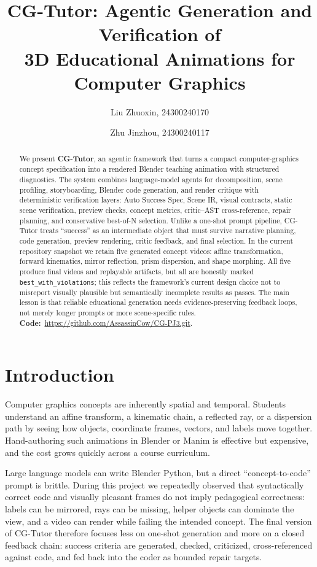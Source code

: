 \documentclass[10pt,letterpaper]{article}
\title{\bfseries CG-Tutor: Agentic Generation and Verification of\\
3D Educational Animations for Computer Graphics}
\author[1]{Liu Zhuoxin, 24300240170}
\author[1]{Zhu Jinzhou, 24300240117}
\affil[1]{Fudan University, Computer Graphics 2026 Spring Project 3}
\date{}
\newcommand{\github}{\url{https://github.com/AssassinCow/CG-PJ3.git}}
\begin{document}
\maketitle

\begin{abstract}
We present \textbf{CG-Tutor}, an agentic framework that turns a compact
computer-graphics concept specification into a rendered Blender teaching
animation with structured diagnostics. The system combines language-model
agents for decomposition, scene profiling, storyboarding, Blender code
generation, and render critique with deterministic verification layers:
Auto Success Spec, Scene IR, visual contracts, static scene verification,
preview checks, concept metrics, critic--AST cross-reference, repair
planning, and conservative best-of-N selection. Unlike a one-shot prompt
pipeline, CG-Tutor treats ``success'' as an intermediate object that must
survive narrative planning, code generation, preview rendering, critic
feedback, and final selection. In the current repository snapshot we
retain five generated concept videos: affine transformation, forward
kinematics, mirror reflection, prism dispersion, and shape morphing. All
five produce final videos and replayable artifacts, but all are honestly
marked \texttt{best\_with\_violations}; this reflects the framework's
current design choice not to misreport visually plausible but semantically
incomplete results as passes. The main lesson is that reliable educational
generation needs evidence-preserving feedback loops, not merely longer
prompts or more scene-specific rules. \textbf{Code:}~\github.
\end{abstract}

\section{Introduction}

Computer graphics concepts are inherently spatial and temporal. Students
understand an affine transform, a kinematic chain, a reflected ray, or a
dispersion path by seeing how objects, coordinate frames, vectors, and
labels move together. Hand-authoring such animations in Blender or Manim is
effective but expensive, and the cost grows quickly across a course
curriculum.

Large language models can write Blender Python, but a direct
``concept-to-code'' prompt is brittle. During this project we repeatedly
observed that syntactically correct code and visually pleasant frames do
not imply pedagogical correctness: labels can be mirrored, rays can be
missing, helper objects can dominate the view, and a video can render while
failing the intended concept. The final version of CG-Tutor therefore
focuses less on one-shot generation and more on a closed feedback chain:
success criteria are generated, checked, criticized, cross-referenced
against code, and fed back into the coder as bounded repair targets.
\end{document}
